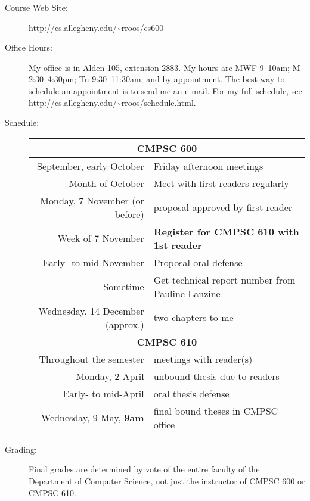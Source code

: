


\begin{description}
\item[Course Web Site:] \url{http://cs.allegheny.edu/~rroos/cs600}
\item[Office Hours:] My office is in Alden 105, extension 2883.  My
hours are
MWF 9--10am; M 2:30--4:30pm; Tu 9:30--11:30am;
and by appointment.  The best way to schedule an appointment is to send me 
an e-mail. For my full schedule, see
\url{http://cs.allegheny.edu/~rroos/schedule.html}.

\item[Schedule:]\mbox{}

\begin{center}
\begin{tabular}{rl}
\hline
\multicolumn{2}{c}{\bf CMPSC 600}\\\hline
September, early October & Friday afternoon meetings\\
Month of October & Meet with first readers regularly\\
Monday, 7 November (or before) & proposal approved by first reader\\
Week of 7 November & \bf Register for CMPSC 610 with 1st reader\\
Early- to mid-November & Proposal oral defense\\
Sometime & Get technical report number from Pauline Lanzine\\
Wednesday, 14 December (approx.) & two chapters to me\\
\hline
\multicolumn{2}{c}{\bf CMPSC 610}\\\hline
Throughout the semester & meetings with reader(s)\\ 
Monday, 2 April & unbound thesis due to readers\\
Early- to mid-April & oral thesis defense\\
Wednesday, 9 May, \bf 9am & final bound theses in CMPSC office
\end{tabular}
\end{center}

\item[Grading:]
Final grades are determined by vote of
the entire faculty of the Department of Computer Science, not just the
instructor of CMPSC 600 or CMPSC 610.


\end{description}
